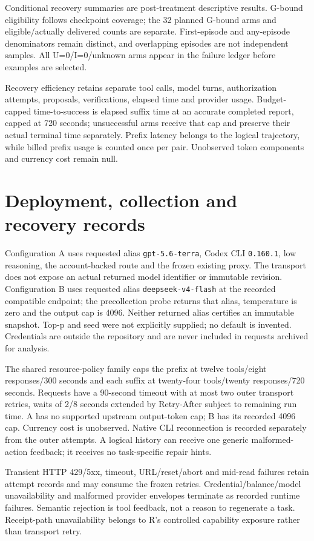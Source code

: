 \documentclass[11pt,a4paper]{article}
\newcommand{\code}[1]{\nolinkurl{#1}}
\begin{document}
Conditional recovery summaries are post-treatment descriptive results. G-bound eligibility follows checkpoint coverage; the 32 planned G-bound arms and eligible/actually delivered counts are separate. First-episode and any-episode denominators remain distinct, and overlapping episodes are not independent samples. All U=0/I=0/unknown arms appear in the failure ledger before examples are selected.

Recovery efficiency retains separate tool calls, model turns, authorization attempts, proposals, verifications, elapsed time and provider usage. Budget-capped time-to-success is elapsed suffix time at an accurate completed report, capped at 720 seconds; unsuccessful arms receive that cap and preserve their actual terminal time separately. Prefix latency belongs to the logical trajectory, while billed prefix usage is counted once per pair. Unobserved token components and currency cost remain null.

\section{Deployment, collection and recovery records}
\label{app:phase2-engineering}
Configuration A uses requested alias \code{gpt-5.6-terra}, Codex CLI \code{0.160.1}, low reasoning, the account-backed route and the frozen existing proxy. The transport does not expose an actual returned model identifier or immutable revision. Configuration B uses requested alias \code{deepseek-v4-flash} at the recorded compatible endpoint; the precollection probe returns that alias, temperature is zero and the output cap is 4096. Neither returned alias certifies an immutable snapshot. Top-p and seed were not explicitly supplied; no default is invented. Credentials are outside the repository and are never included in requests archived for analysis.

The shared resource-policy family caps the prefix at twelve tools/eight responses/300 seconds and each suffix at twenty-four tools/twenty responses/720 seconds. Requests have a 90-second timeout with at most two outer transport retries, waits of 2/8 seconds extended by Retry-After subject to remaining run time. A has no supported upstream output-token cap; B has its recorded 4096 cap. Currency cost is unobserved. Native CLI reconnection is recorded separately from the outer attempts. A logical history can receive one generic malformed-action feedback; it receives no task-specific repair hints.

Transient HTTP 429/5xx, timeout, URL/reset/abort and mid-read failures retain attempt records and may consume the frozen retries. Credential/balance/model unavailability and malformed provider envelopes terminate as recorded runtime failures. Semantic rejection is tool feedback, not a reason to regenerate a task. Receipt-path unavailability belongs to R's controlled capability exposure rather than transport retry.
\end{document}
